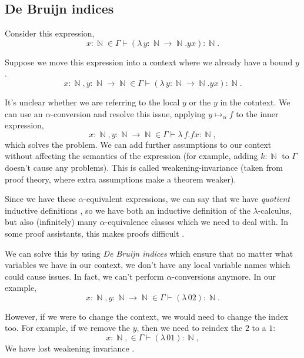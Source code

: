 \documentclass[logo,bsc,singlespacing,parskip,online]{infthesis}
\DeclareMathOperator{\nat}{\mathbb{N}}
\begin{document}
\subsection{De Bruijn indices}
\label{section:background_debruijn}
Consider this expression,
\begin{equation*}
  x \colon \nat \in \Gamma \vdash (\lambda \, y \colon \nat \to \nat. y x) \colon \nat.
\end{equation*}

Suppose we move this expression into a context where we already have a bound
$y$.
\begin{equation*}
  x \colon \nat, y \colon \nat \to \nat \in \Gamma \vdash (\lambda \, y \colon \nat \to \nat. y x) \colon \nat.
\end{equation*}

It's unclear whether we are referring to the local $y$ or the $y$ in the cotntext. We can use an
$\alpha$-conversion and resolve this issue, applying $y \mapsto_{\alpha} f$ to the inner expression,
\begin{equation*}
  x \colon \nat, y \colon \nat \to \nat \in \Gamma \vdash \lambda \, f. f x \colon \nat,
\end{equation*}
which solves the problem. We can add further assumptions to our context without affecting the
semantics of the expression (for example, adding $k \colon \nat$ to $\Gamma$ doesn't cause any
problems). This is called weakening-invariance (taken from proof theory, where extra assumptions
make a theorem weaker).

Since we have these $\alpha$-equivalent expressions, we can say that we have \textit{quotient}
inductive definitions \citep{aydemir_engineering_2008}, so we have both an inductive definition of
the $\lambda$-calculus, but also (infinitely) many $\alpha$-equivalence classes which we need to
deal with. In some proof assistants, this makes proofs difficult \citep{pitts_locally_2023}.

We can solve this by using \textit{De Bruijn indices} which ensure that no matter what variables we
have in our context, we don't have any local variable names which could cause issues. In fact, we
can't perform $\alpha$-conversions anymore. In our example,
\begin{equation*}
  x \colon \nat, y \colon \nat \to \nat \in \Gamma \vdash (\lambda \, 0 2) \colon \nat.
\end{equation*}

However, if we were to change the context, we would need to change the index too. For example, if we
remove the $y$, then we need to reindex the $2$ to a $1$:
\begin{equation*}
  x \colon \nat, \in \Gamma \vdash (\lambda \, 0 1) \colon \nat,
\end{equation*}
We have lost weakening invariance \citep{aydemir_engineering_2008}.
\end{document}
